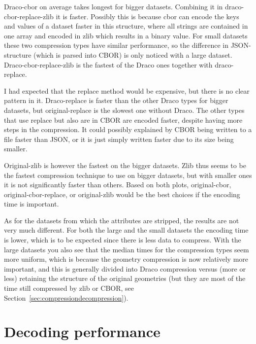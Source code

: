 Draco-cbor on average takes longest for bigger datasets.
Combining it in draco-cbor-replace-zlib it is faster.
Possibly this is because \ac{cbor} can encode the keys and values of a dataset faster in this structure, where all strings are contained in one array and encoded in zlib which results in a binary value.
For small datasets these two compression types have similar performance, so the difference in JSON-structure (which is parsed into CBOR) is only noticed with a large dataset.
Draco-cbor-replace-zlib is the fastest of the Draco ones together with draco-replace.

I had expected that the replace method would be expensive, but there is no clear pattern in it.
Draco-replace is faster than the other Draco types for bigger datasets, but original-replace is the slowest one without Draco.
The other types that use replace but also are in CBOR are encoded faster, despite having more steps in the compression.
It could possibly explained by CBOR being written to a file faster than JSON, or it is just simply written faster due to its size being smaller.

Original-zlib is however the fastest on the bigger datasets.
Zlib thus seems to be the fastest compression technique to use on bigger datasets, but with smaller ones it is not significantly faster than others.
Based on both plots, original-cbor, original-cbor-replace, or original-zlib would be the best choices if the encoding time is important.

As for the datasets from which the attributes are stripped, the results are not very much different.
For both the large and the small datasets the encoding time is lower, which is to be expected since there is less data to compress.
With the large datasets you also see that the median times for the compression types seem more uniform, which is because the geometry compression is now relatively more important, and this is generally divided into Draco compression versus (more or less) retaining the structure of the original geometries (but they are most of the time still compressed by zlib or CBOR, see Section~\ref{sec:compressiondecompression}).






\newpage
\section{Decoding performance}
\label{sec:decodingperformance}

